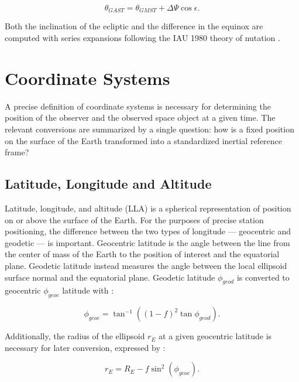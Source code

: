 \begin{equation} \label{eq:date_to_gast}
  \theta_{GAST} = \theta_{GMST} + \Delta \Psi \cos\epsilon.
\end{equation}

Both the inclination of the ecliptic and the difference in the equinox are computed with series expansions following the IAU 1980 theory of nutation \cite{vallado4ed}.

\section{Coordinate Systems}

A precise definition of coordinate systems is necessary for determining the position of the observer and the observed space object at a given time. The relevant conversions are summarized by a single question: how is a fixed position on the surface of the Earth transformed into a standardized inertial reference frame?

\subsection{Latitude, Longitude and Altitude}

Latitude, longitude, and altitude (LLA) is a spherical representation of position on or above the surface of the Earth. For the purposes of precise station positioning, the difference between the two types of longitude --- geocentric and geodetic --- is important. Geocentric latitude is the angle between the line from the center of mass of the Earth to the position of interest and the equatorial plane. Geodetic latitude instead measures the angle between the local ellipsoid surface normal and the equatorial plane. Geodetic latitude $\phi_{geod}$ is converted to geocentric $\phi_{geoc}$ latitude with \cite{frueh2019notes}:

\begin{equation} \label{eq:geod_to_geoc}
  \phi_{geoc} = \tan^{-1} \left((1 - f)^2 \tan\phi_{geod} \right).
\end{equation}

Additionally, the radius of the ellipsoid $r_E$ at a given geocentric latitude is necessary for later conversion, expressed by \cite{frueh2019notes}:

\begin{equation} \label{eq:rad_at_geoc}
  r_E = R_E - f \sin^2 \left( \phi_{geoc} \right).
\end{equation}

